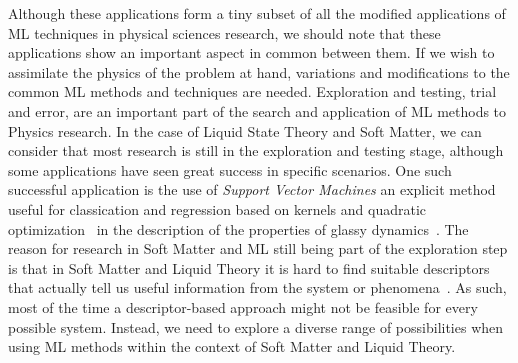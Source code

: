 Although these applications form a tiny subset of all the modified applications of ML 
techniques in physical sciences research, we should note that these applications show an 
important aspect in common between them. If we wish to assimilate the physics of the 
problem at hand, variations and modifications to the common ML methods and techniques are 
needed. Exploration and testing, trial and error, are an important part of the search and 
application of ML methods to Physics research. In the case of Liquid State Theory and Soft 
Matter, we can consider that most research is still in the exploration and testing stage,
although some applications have seen great success in specific scenarios.
One such successful application is the use of \emph{Support Vector Machines}\textemdash
an explicit method useful for classication and regression based on kernels and
quadratic optimization~\cite{steinwartSupportVectorMachines2008}\textemdash
in the description of the properties of glassy dynamics~\cite{schoenholzStructuralApproachRelaxation2016}.
The reason for research in Soft Matter and ML still being part of the exploration step is 
that in Soft Matter and Liquid Theory it is hard to find suitable descriptors that 
actually tell us useful information from the system or phenomena~\cite{dijkstraPredictiveModellingMachine2021a}.
As such, most of the time a descriptor-based approach might not be feasible for every 
possible system. Instead, we need to explore a diverse range of possibilities when using ML 
methods within the context of Soft Matter and Liquid Theory.


